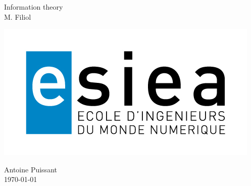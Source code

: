 \begin{titlepage}
 
 \begin{center}
  
  \vspace*{2cm}
  {\Huge Information theory}\\
  \vspace{.7cm}
  {\huge M. Filiol}
  \vspace{2cm}

   \begin{center}
     \includegraphics[width=.9\textwidth]{./img/esiea.jpeg}
   \end{center}
  \vspace{1cm}
  {\Large Antoine Puissant}\\
  \vspace{1cm}
  {\Large \today}
  
 \end{center}

 
\end{titlepage}
